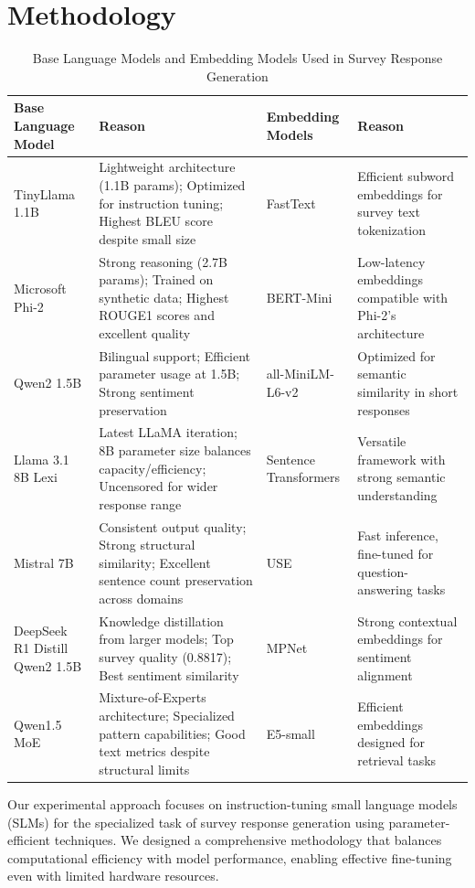 \documentclass[11pt]{article}
\begin{document}
\section{Methodology}
\begin{table}[ht]
  \centering
  \begin{tabular}{|p{2.6cm}|p{4.8cm}|p{2.6cm}|p{4.8cm}|}
    \hline
    \textbf{Base Language Model} & \textbf{Reason} & \textbf{Embedding Models} & \textbf{Reason} \\
    \hline
    TinyLlama 1.1B & Lightweight architecture (1.1B params); Optimized for instruction tuning; Highest BLEU score despite small size & FastText & Efficient subword embeddings for survey text tokenization \\
    \hline
    Microsoft Phi-2 & Strong reasoning (2.7B params); Trained on synthetic data; Highest ROUGE1 scores and excellent quality & BERT-Mini & Low-latency embeddings compatible with Phi-2's architecture \\
    \hline 
    Qwen2 1.5B & Bilingual support; Efficient parameter usage at 1.5B; Strong sentiment preservation & all-MiniLM-L6-v2 & Optimized for semantic similarity in short responses \\
    \hline
    Llama 3.1 8B Lexi & Latest LLaMA iteration; 8B parameter size balances capacity/efficiency; Uncensored for wider response range & Sentence Transformers & Versatile framework with strong semantic understanding \\
    \hline
    Mistral 7B & Consistent output quality; Strong structural similarity; Excellent sentence count preservation across domains & USE & Fast inference, fine-tuned for question-answering tasks \\
    \hline
    DeepSeek R1 Distill Qwen2 1.5B & Knowledge distillation from larger models; Top survey quality (0.8817); Best sentiment similarity & MPNet & Strong contextual embeddings for sentiment alignment \\
    \hline
    Qwen1.5 MoE & Mixture-of-Experts architecture; Specialized pattern capabilities; Good text metrics despite structural limits & E5-small & Efficient embeddings designed for retrieval tasks \\
    \hline
  \end{tabular}
  \caption{Base Language Models and Embedding Models Used in Survey Response Generation}
\end{table}

Our experimental approach focuses on instruction-tuning small language models (SLMs) for the specialized task of survey response generation using parameter-efficient techniques. We designed a comprehensive methodology that balances computational efficiency with model performance, enabling effective fine-tuning even with limited hardware resources.
\end{document}

